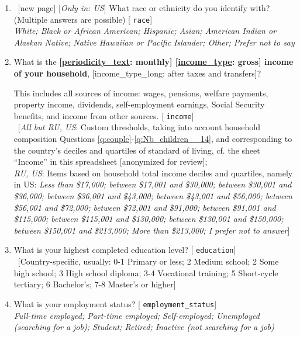 \documentclass[12pt,english]{article}
\begin{document}
\begin{bibunit}
\begin{enumerate}[resume]
\item ~[new page] \label{q:race} [\textit{Only in: US}] What race or ethnicity do you identify with? (Multiple answers are possible) [%
\verb|race|]
  \\ \textit{White; Black or African American; Hispanic; Asian; American Indian or Alaskan Native; Native Hawaiian or Pacific Islander; Other; Prefer not to say}

\item  \label{q:income} What is the \textbf{[\hyperlink{tab_features}{periodicity\_text}: monthly] [\hyperlink{tab_features}{income\_type}: gross] income of your household}, [income\_type\_long: after taxes and transfers]?

This includes all sources of income: wages, pensions, welfare payments, property income, dividends, self-employment earnings, Social Security benefits, and income from other sources. [%
\verb|income|]
  \\ ~[\textit{All but RU, US}: Custom thresholds, taking into account household composition Questions \ref{q:couple}-\ref{q:Nb_children__14}, and corresponding to the country's deciles and quartiles of standard of living, cf. the sheet ``Income'' in this spreadsheet [anonymized for review]; \\ \textit{RU, US}: Items based on household total income deciles and quartiles, namely in US: \textit{Less than \$17,000; between \$17,001 and \$30,000; between \$30,001 and \$36,000; between \$36,001 and \$43,000; between \$43,001 and \$56,000; between \$56,001 and \$72,000; between \$72,001 and \$91,000; between \$91,001 and \$115,000; between \$115,001 and \$130,000; between \$130,001 and \$150,000; between \$150,001 and \$213,000; More than \$213,000; I prefer not to answer}]  %

\item  \label{q:education} What is your highest completed education level? [%
\verb|education|]
  \\ ~[Country-specific, usually: 0-1 Primary or less; 2 Medium school; 2 Some high school; 3 High school diploma; 3-4 Vocational training; 5 Short-cycle tertiary; 6 Bachelor's; 7-8 Master's or higher]

\item  \label{q:employment_status} What is your employment status? [%
\verb|employment_status|]
  \\ \textit{Full-time employed; Part-time employed; Self-employed; Unemployed (searching for a job); Student; Retired; Inactive (not searching for a job)}


\end{enumerate}
\end{bibunit}
\end{document}
